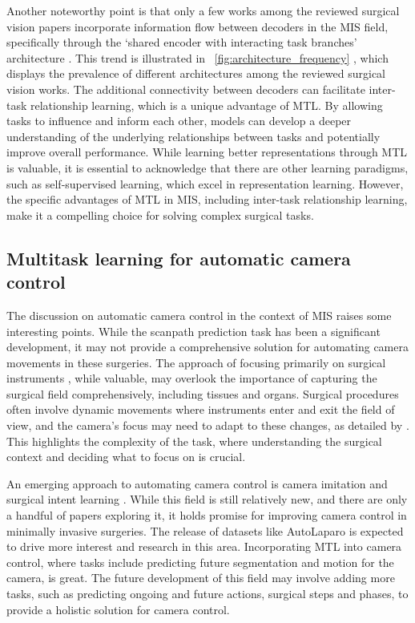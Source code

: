 \documentclass[times,twocolumn,final]{elsarticle}
\renewcommand{\cite}[1]{\citep{#1}}
\newcommand{\figref}[1]{\figurename~\ref{#1}}
\begin{document}
Another noteworthy point is that only a few works among the reviewed surgical vision papers incorporate information flow between decoders in the MIS field, specifically through the `shared encoder with interacting task branches' architecture \cite{NWOYE2022102433_rendevous,sharma2022RendezvousInTime,seenivasan2022global}. This trend is illustrated in \figref{fig:architecture_frequency}
, which displays the prevalence of different architectures among the reviewed surgical vision works. The additional connectivity between decoders can facilitate inter-task relationship learning, which is a unique advantage of MTL. By allowing tasks to influence and inform each other, models can develop a deeper understanding of the underlying relationships between tasks and potentially improve overall performance. While learning better representations through MTL is valuable, it is essential to acknowledge that there are other learning paradigms, such as self-supervised learning, which excel in representation learning. However, the specific advantages of MTL in MIS, including inter-task relationship learning, make it a compelling choice for solving complex surgical tasks.



\subsection{Multitask learning for automatic camera control}
The discussion on automatic camera control in the context of MIS raises some interesting points. While the scanpath prediction task has been a significant development, it may not provide a comprehensive solution for automating camera movements in these surgeries. The approach of focusing primarily on surgical instruments \citep{learning_look_tracking,Islam2020_ST_MTL}, while valuable, may overlook the importance of capturing the surgical field comprehensively, including tissues and organs. Surgical procedures often involve dynamic movements where instruments enter and exit the field of view, and the camera's focus may need to adapt to these changes, as detailed by \citet{prostatectomy_video}. This highlights the complexity of the task, where understanding the surgical context and deciding what to focus on is crucial.

An emerging approach to automating camera control is camera imitation and surgical intent learning \citep{10.1007/978-3-031-43996-4_21,9772402}. While this field is still relatively new, and there are only a handful of papers exploring it, it holds promise for improving camera control in minimally invasive surgeries. The release of datasets like AutoLaparo is expected to drive more interest and research in this area. Incorporating MTL into camera control, where tasks include predicting future segmentation and motion for the camera, is great. The future development of this field may involve adding more tasks, such as predicting ongoing and future actions, surgical steps and phases, to provide a holistic solution for camera control.
\end{document}
